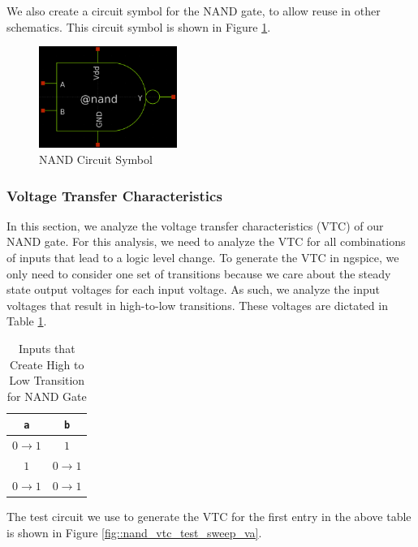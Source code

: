 \documentclass[fleqn]{article}
\begin{document}
	\noindent We also create a circuit symbol for the NAND gate, to allow reuse in other schematics. This circuit symbol is shown in Figure \ref{fig::nand_symbol}.
	
	\begin{figure}[H]
		\centerline{\includegraphics[width=0.4\textwidth]{nand_symbol.png}}
		\caption{NAND Circuit Symbol}
		\label{fig::nand_symbol}
	\end{figure}
	
	\subsubsection{Voltage Transfer Characteristics}
	
	In this section, we analyze the voltage transfer characteristics (VTC) of our NAND gate. For this analysis, we need to analyze the VTC for all combinations of inputs that lead to a logic level change. To generate the VTC in ngspice, we only need to consider one set of transitions because we care about the steady state output voltages for each input voltage. As such, we analyze the input voltages that result in high-to-low transitions. These voltages are dictated in Table \ref{table::nand_gate_high_to_low_transitions}.
	
	\begin{table}[H]
	\begin{center}
	\caption{Inputs that Create High to Low Transition for NAND Gate}
	\label{table::nand_gate_high_to_low_transitions}
	\begin{tabular}{| c | c |}
		\hline
		\texttt{a} & \texttt{b} \\
		\hline	
		$0 \rightarrow 1$ & $1$\\
		\hline	
		$1$ & $0 \rightarrow 1$\\
		\hline	
		$0 \rightarrow 1$ & $0 \rightarrow 1$\\
		\hline
	\end{tabular}
	\end{center}
	\end{table}
	
	\noindent The test circuit we use to generate the VTC for the first entry in the above table is shown in Figure \ref{fig::nand_vtc_test_sweep_va}.
	
\end{document}

